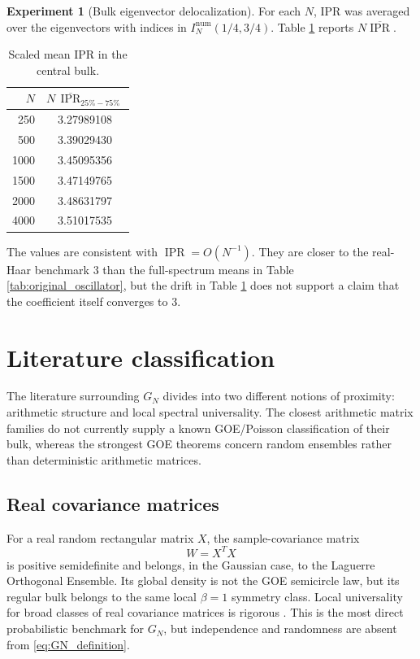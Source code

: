 \documentclass[11pt]{amsart}
\numberwithin{equation}{section}
\theoremstyle{plain}
\theoremstyle{definition}
\newtheorem{experiment}[theorem]{Experiment}
\theoremstyle{remark}
\newcommand{\IPR}{\operatorname{IPR}}
\begin{document}
\begin{experiment}[Bulk eigenvector delocalization]
\label{exp:bulk_ipr}
For each $N$, IPR was averaged over the eigenvectors with indices in $I_N^{\mathrm{num}}(1/4,3/4)$.  Table \ref{tab:bulk_ipr} reports $N\overline{\IPR}$.

\begin{table}[htbp]
\centering
\caption{Scaled mean IPR in the central bulk.}
\label{tab:bulk_ipr}
\begin{tabular}{rc}
\toprule
$N$ & $N\,\overline{\IPR}_{25\%-75\%}$\\
\midrule
250  & 3.27989108\\
500  & 3.39029430\\
1000 & 3.45095356\\
1500 & 3.47149765\\
2000 & 3.48631797\\
4000 & 3.51017535\\
\bottomrule
\end{tabular}
\end{table}

The values are consistent with $\IPR=O(N^{-1})$.  They are closer to the real-Haar benchmark $3$ than the full-spectrum means in Table \ref{tab:original_oscillator}, but the drift in Table \ref{tab:bulk_ipr} does not support a claim that the coefficient itself converges to $3$.
\end{experiment}

\section{Literature classification}
\label{sec:literature_classification}

The literature surrounding $G_N$ divides into two different notions of proximity: arithmetic structure and local spectral universality.  The closest arithmetic matrix families do not currently supply a known GOE/Poisson classification of their bulk, whereas the strongest GOE theorems concern random ensembles rather than deterministic arithmetic matrices.

\subsection{Real covariance matrices}
\label{subsec:covariance_literature}

For a real random rectangular matrix $X$, the sample-covariance matrix
\begin{equation}
W=X^TX
\label{eq:wishart_matrix}
\end{equation}
is positive semidefinite and belongs, in the Gaussian case, to the Laguerre Orthogonal Ensemble.  Its global density is not the GOE semicircle law, but its regular bulk belongs to the same local $\beta=1$ symmetry class.  Local universality for broad classes of real covariance matrices is rigorous \cite{TaoVu2012,PillaiYin2014}.  This is the most direct probabilistic benchmark for $G_N$, but independence and randomness are absent from \eqref{eq:GN_definition}.
\end{document}
